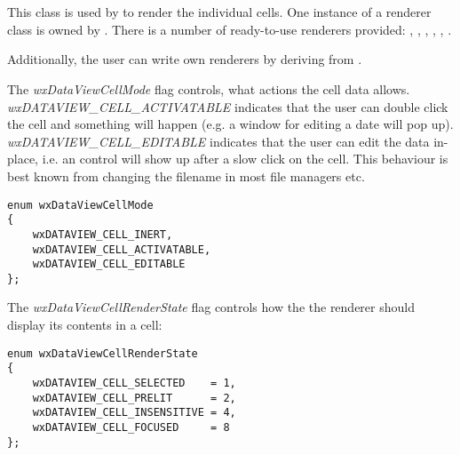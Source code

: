 
\section{}\label{wxdataviewrenderer}


This class is used by  to
render the individual cells. One instance of a renderer class is
owned by . There is
a number of ready-to-use renderers provided:
,
,
,
,
,
.

Additionally, the user can write own renderers by deriving from
.

The {\it wxDataViewCellMode} flag controls, what actions
the cell data allows. {\it wxDATAVIEW\_CELL\_ACTIVATABLE}
indicates that the user can double click the cell and
something will happen (e.g. a window for editing a date
will pop up). {\it wxDATAVIEW\_CELL\_EDITABLE} indicates
that the user can edit the data in-place, i.e. an control
will show up after a slow click on the cell. This behaviour
is best known from changing the filename in most file 
managers etc.



{\small
\begin{verbatim}
enum wxDataViewCellMode
{
    wxDATAVIEW_CELL_INERT,
    wxDATAVIEW_CELL_ACTIVATABLE,
    wxDATAVIEW_CELL_EDITABLE
};
\end{verbatim}
}

The {\it wxDataViewCellRenderState} flag controls how the
the renderer should display its contents in a cell:

{\small
\begin{verbatim}
enum wxDataViewCellRenderState
{
    wxDATAVIEW_CELL_SELECTED    = 1,
    wxDATAVIEW_CELL_PRELIT      = 2,
    wxDATAVIEW_CELL_INSENSITIVE = 4,
    wxDATAVIEW_CELL_FOCUSED     = 8
};
\end{verbatim}
}





